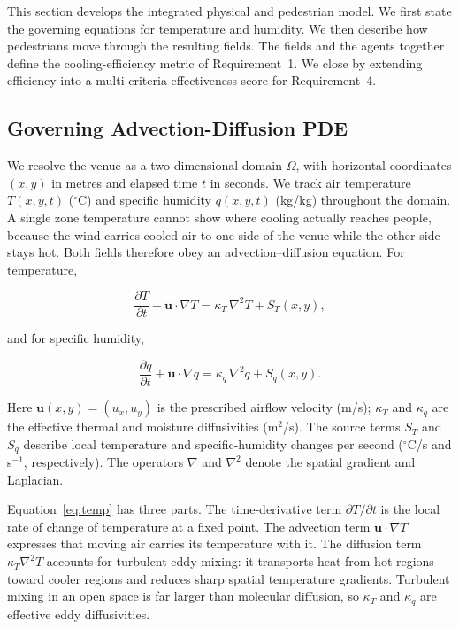 \documentclass[11pt]{article}
\begin{document}
This section develops the integrated physical and pedestrian model. We first
state the governing equations for temperature and humidity. We then describe
how pedestrians move through the resulting fields. The fields and the agents
together define the cooling-efficiency metric of Requirement~1. We close by
extending efficiency into a multi-criteria effectiveness score for
Requirement~4.

\subsection{Governing Advection-Diffusion PDE}

We resolve the venue as a two-dimensional domain $\Omega$, with horizontal
coordinates $(x,y)$ in metres and elapsed time $t$ in seconds. We track air
temperature $T(x,y,t)$ ($^{\circ}$C) and specific humidity $q(x,y,t)$
(kg/kg) throughout the domain. A single zone temperature cannot show where cooling actually reaches people,
because the wind carries cooled air to one side of the venue while the other
side stays hot. Both fields therefore obey an advection--diffusion equation. For
temperature,

\begin{equation}
\frac{\partial T}{\partial t} + \mathbf{u}\cdot\nabla T
= \kappa_T\,\nabla^{2} T + S_T(x,y),
\label{eq:temp}
\end{equation}

and for specific humidity,

\begin{equation}
\frac{\partial q}{\partial t} + \mathbf{u}\cdot\nabla q
= \kappa_q\,\nabla^{2} q + S_q(x,y).
\label{eq:hum}
\end{equation}

Here $\mathbf{u}(x,y)=(u_x,u_y)$ is the prescribed airflow velocity (m/s);
$\kappa_T$ and $\kappa_q$ are the effective thermal and moisture diffusivities
(m$^2$/s). The source terms $S_T$ and $S_q$ describe local temperature and
specific-humidity changes per second ($^{\circ}$C/s and s$^{-1}$, respectively).
The operators $\nabla$ and $\nabla^2$ denote the spatial gradient and Laplacian.

Equation~\eqref{eq:temp} has three parts. The time-derivative term
$\partial T/\partial t$ is the local rate of change of temperature at a fixed
point. The advection term $\mathbf{u}\cdot\nabla T$ expresses that moving air
carries its temperature with it. The diffusion term $\kappa_T\nabla^{2}T$ accounts
for turbulent eddy-mixing: it transports heat from hot regions toward cooler regions and
reduces sharp spatial temperature gradients. Turbulent mixing in an open space is
far larger than molecular diffusion, so $\kappa_T$ and $\kappa_q$ are effective
eddy diffusivities.
\end{document}

